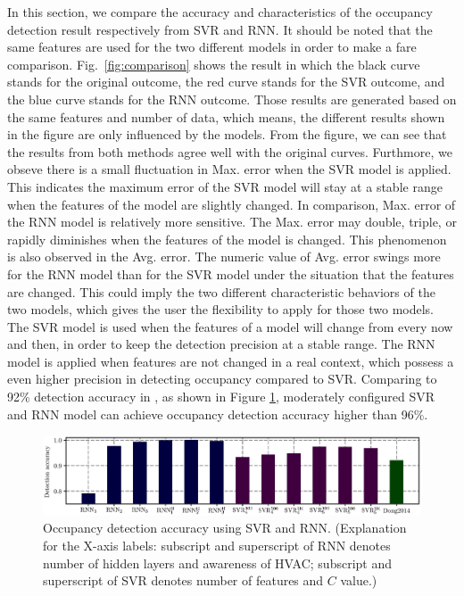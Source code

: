 \textcolor{feb18rev}{In this section, we compare the accuracy and characteristics of the
occupancy detection result respectively from SVR and RNN. It should be noted that the same
features are used for the two different models in order to make a fare comparison.}
Fig.~\ref{fig:comparison} shows the result in which the black curve
stands for the original outcome, the red curve stands for the SVR
outcome, and the blue curve stands for the RNN outcome.  Those results
are generated based on the same features and number of data, which
means, the different results shown in the figure are only influenced
by the models. From the figure, we can see that the results from both
methods agree well with the original curves.  Furthmore, we obseve
there is a small fluctuation in Max. error when the SVR model is
applied. This indicates the maximum error of the SVR model will stay
at a stable range when the features of the model are slightly
changed. In comparison, Max. error of the RNN model is relatively more
sensitive. The Max. error may double, triple, or rapidly diminishes
when the features of the model is changed. This phenomenon is also
observed in the Avg. error. The numeric value of Avg. error swings
more for the RNN model than for the SVR model under the situation that
the features are changed. This could imply the two different
characteristic behaviors of the two models, which gives the user the
flexibility to apply for those two models. The SVR model is used when
the features of a model will change from every now and then, in order
to keep the detection precision at a stable range. The RNN model is applied
when features are not changed in a real context, which possess a even higher
precision in detecting occupancy compared to SVR.
\textcolor{feb18rev}{Comparing to 92\% detection accuracy in \cite
{dong2014real}, as shown in Figure \ref{fig:accuracy-comparison}, moderately
configured SVR and RNN model can achieve occupancy detection accuracy higher
than 96\%.}

\begin{figure}[h]
    \centering
    \includegraphics[width=\textwidth]{./figs/results/results_compare.eps}
    \caption{\textcolor{feb18rev}{Occupancy detection accuracy using SVR and
    RNN. (Explanation for the X-axis labels: subscript and superscript of RNN
    denotes number of hidden layers and awareness of HVAC; subscript and
    superscript of SVR denotes number of features and $C$ value.)}}
    \label{fig:accuracy-comparison}
\end{figure}

